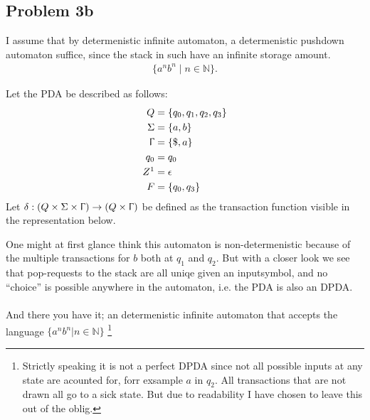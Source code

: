 \documentclass{article}
\begin{document}
\subsection{Problem 3b}
I assume that by determenistic infinite automaton, a determenistic pushdown automaton suffice, since the stack in such have an infinite storage amount.
\begin{align*}
  \{a^n b^n\mid n\in\mathbb N\}.
\end{align*}

Let the PDA be described as follows:
\begin{align*}
  Q &= \{q_0, q_1, q_2, q_3 \}\\
  \Sigma &= \{a,b\} \\
  \Upgamma & = \{\$, a\}\\
  q_0 &= q_0 \\
  Z\footnotemark &= \epsilon\\
  F &= \{q_0, q_3\}
\end{align*}
Let $\delta : (Q \times \Sigma \times \Upgamma) \rightarrow (Q \times \Upgamma)$ be defined as the transaction function visible in the representation below.

\begin{center}
\end{center}

One might at first glance think this automaton is non-determenistic because of the multiple transactions for $b$ both at $q_1$ and $q_2$.
But with a closer look we see that pop-requests to the stack are all uniqe given an inputsymbol, and no ``choice'' is possible anywhere in the automaton, i.e. the PDA is also an DPDA.
\\ \ \\
And there you have it; an determenistic infinite automaton that accepts the language $\{a^nb^n| n \in \mathbb{N}\}$ \footnote{Strictly speaking it is not a perfect DPDA since not all possible inputs at any state are acounted for, forr exsample $a$ in $q_2$. All transactions that are not drawn all go to a sick state. But due to readability I have chosen to leave this out of the oblig.}
\end{document}
